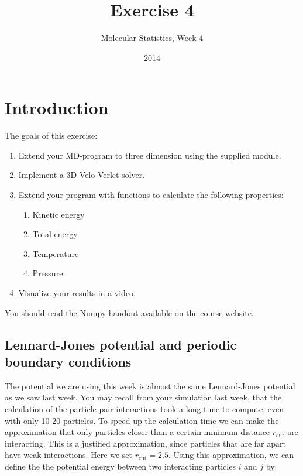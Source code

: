 \documentclass{article}
\title{Exercise 4}
\author{Molecular Statistics, Week 4}
\date{2014}
\begin{document}

\maketitle

\section{Introduction}

The goals of this exercise:
\begin{enumerate}
    \item Extend your MD-program to three dimension using the supplied module.

    \item Implement a 3D Velo-Verlet solver.

    \item Extend your program with functions to calculate the following properties:
    \begin{enumerate}
        \item Kinetic energy
        \item Total energy
        \item Temperature
        \item Pressure
    \end{enumerate}

    \item Visualize your results in a video.

\end{enumerate}


You should read the Numpy handout available on the course website.


\subsection{Lennard-Jones potential and periodic boundary conditions}

The potential we are using this week is almost the same Lennard-Jones potential
as we saw last week.  You may recall from your simulation last week, that the
calculation of the particle pair-interactions took a long time to compute, even
with only 10-20 particles.
To speed up the calculation time we can make the approximation that only
particles closer than a certain minimum distance $r_{\mathrm{cut}}$ are
interacting.
This is a justified approximation, since particles that are
far apart have weak interactions.
Here we set $r_{\mathrm{cut}} = 2.5$.
Using this approximation, we can define the the potential energy between two
interacting particles $i$ and $j$ by:
\end{document}
